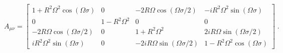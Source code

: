 \begin{equation}
A_{\mu \nu} =
\left[
 \begin{array}{cccc}
 1+R^2\Omega^2\cos(\Omega\sigma) & 0 & 
             -2R\Omega\cos(\Omega\sigma/2) & -iR^2\Omega^2\sin(\Omega\sigma)\\
 0 & 1-R^2\Omega^2 & 
             0 & 0\\
 -2R\Omega \cos (\Omega\sigma/2) & 0 & 
             1+R^2\Omega^2 & 2iR\Omega \sin(\Omega\sigma/2)\\
 iR^2\Omega^2\sin(\Omega\sigma) & 0 & 
            -2iR\Omega\sin(\Omega\sigma/2) & 1-R^2\Omega^2\cos(\Omega\sigma)    
 \end{array} 
\right] \; .
\label{A}
\end{equation}

